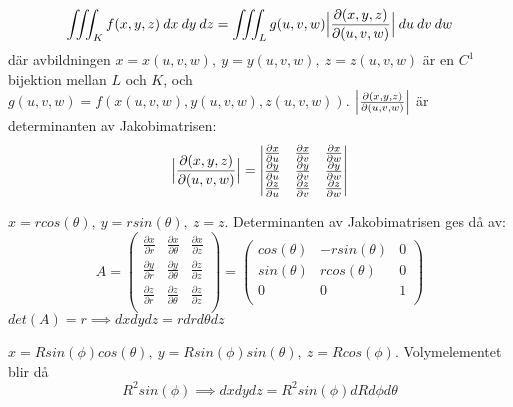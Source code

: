 \documentclass{report}
\begin{document}
{
\begin{equation*}
\iiint_{K}^{} f(x,y,z) \: dx \: dy  \: dz = \iiint_{L}^{} g(u,v,w) \Bigl| \frac{\partial(x,y,z)}{\partial(u,v,w)}  \Bigl| \: du  \: dv  \: dw 
\end{equation*}
där avbildningen $ x = x(u,v,w), \: y = y(u,v,w),\: z = z(u,v,w) $ är en $ C^1 $ bijektion mellan $ L $ och $ K $, och $ g(u,v,w) = f(x(u,v,w), y(u,v,w), z(u,v,w)) $. $ \Bigl| \frac{\partial(x,y,z)}{\partial(u,v,w)}  \Bigr| $ är determinanten av Jakobimatrisen:
\begin{equation*}
\Bigl| \frac{\partial(x,y,z)}{\partial(u,v,w)} \Bigr| =
\begin{vmatrix}
	\frac{\partial x }{\partial u  }  & \frac{\partial x }{\partial v }   & \frac{\partial x }{\partial w }  \\
	\frac{\partial y }{\partial u }  & \frac{\partial y }{\partial v }  & \frac{\partial y }{\partial w }  \\
	\frac{\partial z }{\partial u }  & \frac{\partial z }{\partial v }  & \frac{\partial z }{\partial w }  \\
\end{vmatrix}
\end{equation*}
}

{
$ x = rcos(\theta), \: y = rsin(\theta), \: z = z $. Determinanten av Jakobimatrisen ges då av:
\begin{equation*}
A =
\begin{pmatrix}
	\frac{\partial x }{\partial r }  & \frac{\partial x }{\partial \theta }  & \frac{\partial x }{\partial z }  \\
	\frac{\partial y }{\partial r }  & \frac{\partial y }{\partial \theta }  & \frac{\partial z }{\partial z }  \\
	\frac{\partial z }{\partial r }  & \frac{\partial z }{\partial \theta }  &  \frac{\partial z }{\partial z }  \\
\end{pmatrix} =
\begin{pmatrix}
	cos(\theta) & -rsin(\theta) & 0 \\
	sin(\theta) & rcos(\theta) & 0 \\
	0 & 0 & 1 \\
\end{pmatrix}
\end{equation*}
$ det(A) = r \implies dxdydz = rdrd\theta dz $ 
}

{
	$ x = Rsin(\phi)cos(\theta), \: y = Rsin(\phi)sin(\theta), \: z = Rcos(\phi) $. Volymelementet blir då
\begin{equation*}
R^2 sin(\phi) \implies dxdydz = R^2 sin(\phi) dRd\phi d\theta
\end{equation*}
}
\end{document}
